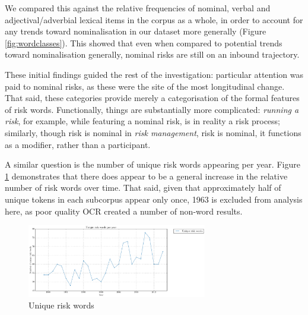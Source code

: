 
	We compared this against the relative frequencies of nominal, verbal and adjectival\slash adverbial lexical items in the corpus as a whole, in order to account for any trends toward nominalisation in our dataset more generally (Figure \ref{fig:wordclasses}). This showed that even when compared to potential trends toward nominalisation generally, nominal risks are still on an inbound trajectory.

	These initial findings guided the rest of the investigation: particular attention was paid to nominal risks, as these were the site of the most longitudinal change. That said, these categories provide merely a categorisation of the formal features of risk words. Functionally, things are substantially more complicated: \emph{running a risk}, for example, while featuring a nominal risk, is in reality a risk process; similarly, though risk is nominal in \emph{risk management}, risk is nominal, it functions as a modifier, rather than a participant.

    A similar question is the number of unique risk words appearing per year. Figure \ref{fig:diffriskwords} demonstrates that there does appear to be a general increase in the relative number of risk words over time. That said, given that approximately half of unique tokens in each subcorpus appear only once, 
        1963 is excluded from analysis here, as poor quality OCR created a number of non-word results.

            \begin{figure}[htb!]
            \centering
            \includegraphics[width=0.7\textwidth]{../images/unique_risk_words_per_year.png}
            \caption{Unique risk words}
            \label{fig:diffriskwords}
            \end{figure}



